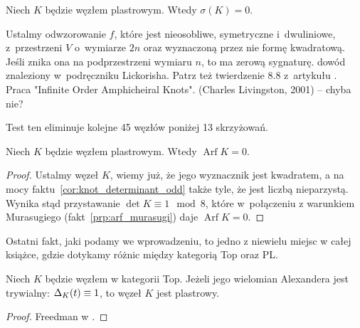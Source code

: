 \begin{proposition}
%
    Niech $K$ będzie węzłem plastrowym.
    Wtedy $\sigma(K) = 0$.
\end{proposition}

\begin{tobedone}
    Ustalmy odwzorowanie $f$, które jest nieosobliwe, symetryczne i~dwuliniowe, z~przestrzeni $V$ o~wymiarze $2n$ oraz wyznaczoną przez nie formę kwadratową.
    Jeśli znika ona na podprzestrzeni wymiaru $n$, to ma zerową sygnaturę.
    dowód znaleziony w~podręczniku Lickorisha.
    Patrz też twierdzenie 8.8 z~artykułu \cite{murasugi65}.
    Praca "Infinite Order Amphicheiral Knots". (Charles Livingston, 2001) -- chyba nie?
\end{tobedone}

Test ten eliminuje kolejne 45 węzłów poniżej 13 skrzyżowań.

\begin{proposition}
    Niech $K$ będzie węzłem plastrowym.
    Wtedy $\operatorname{Arf} K = 0$.
\end{proposition}

\begin{proof}
    Ustalmy węzeł $K$, wiemy już, że jego wyznacznik jest kwadratem, a na mocy faktu~\ref{cor:knot_determinant_odd} także tyle, że jest liczbą nieparzystą.
    Wynika stąd przystawanie $\det K \equiv 1 \mod 8$, które w~połączeniu z warunkiem Murasugiego (fakt~\ref{prp:arf_murasugi}) daje $\operatorname{Arf} K = 0$.
\end{proof}


Ostatni fakt, jaki podamy we wprowadzeniu, to jedno z niewielu miejsc w całej książce, gdzie dotykamy różnic między kategorią Top oraz PL.

\begin{proposition}
\label{prp:trivial_alexander_implies_slice}%
    Niech $K$ będzie węzłem w kategorii Top.
    Jeżeli jego wielomian Alexandera jest trywialny: $\Delta_K(t) \equiv 1$, to węzeł $K$ jest plastrowy.
\end{proposition}

\begin{proof}
%
    Freedman w \cite[tw. 1.13]{freedman82}.
\end{proof}


